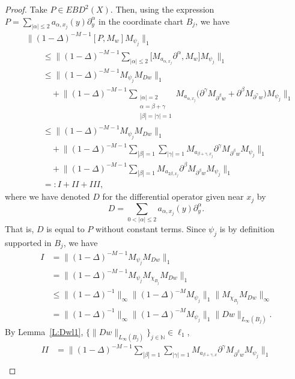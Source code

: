 \documentclass[pdftex]{sigma}
\numberwithin{equation}{section}
\begin{document}
\begin{proof}
Take $P \in EBD^2(X).$ Then, using the expression $P = \sum_{|\alpha|\leq 2} a_{\alpha,x_j}(y)\partial_y^{\alpha}$ in the coordinate chart $B_j$, we have
\begin{align*}
&\big\|(1-\Delta)^{-M-1}[P,M_w] M_{\psi_j}\big\|_1 \\
&\qquad{}
  \leq \bigg\|(1-\Delta)^{-M-1}\sum_{|\alpha|\leq 2} \big[M_{a_{\alpha,x_j}} \partial^\alpha,M_w\big] M_{\psi_j}\bigg\|_1\\
&\qquad {}\leq \big\|(1-\Delta)^{-M-1} M_{\psi_j} M_{D w}\big\|_1\\
&\qquad\quad{} + \bigg\|(1-\Delta)^{-M-1}\sum_{\substack{|\alpha|=2\\\alpha = \beta + \gamma\\|\beta|=|\gamma|= 1}} M_{a_{\alpha,x_j}} \big(\partial^\gamma M_{\partial^\beta w}+\partial^\beta M_{\partial^\gamma w}\big) M_{\psi_j}\bigg\|_1\\
&\qquad {}\leq \big\|(1-\Delta)^{-M-1} M_{\psi_j} M_{D w}\big\|_1\\
&\qquad\quad{} + \bigg\|(1-\Delta)^{-M-1}\sum_{|\beta|=1}\sum_{|\gamma|=1} M_{a_{\beta+\gamma,x_j}} \partial^\gamma M_{\partial^\beta w} M_{\psi_j}\bigg\|_1\\
&\qquad\quad{} + \bigg\|(1-\Delta)^{-M-1}\sum_{|\beta|=1} M_{a_{2\beta,x_j}} \partial^\beta M_{\partial^\beta w} M_{\psi_j}\bigg\|_1\\
&\qquad {}=: I + II + III,
\end{align*}
where we have denoted $D$ for the differential operator given near $x_j$ by
\[
 D = \sum_{0<|\alpha|\leq 2} a_{\alpha,x_j}(y)\partial_y^{\alpha}.
\]
That is, $D$ is equal to $P$ without constant terms. Since $\psi_j$ is by definition supported in $B_j$, we have
\begin{align*}
I &= \big\|(1-\Delta)^{-M-1} M_{\psi_j} M_{D w}\big\|_1\\
&= \big\|(1-\Delta)^{-M-1} M_{\psi_j} M_{\chi_{B_j}}M_{D w}\big\|_1\\
&\leq \big\| (1-\Delta)^{-1}\big\|_\infty \big\|(1-\Delta)^{-M} M_{\psi_j}\big\|_{1} \| M_{\chi_{B_j}}M_{D w} \|_\infty\\
&=\big\| (1-\Delta)^{-1}\big\|_\infty \big\|(1-\Delta)^{-M} M_{\psi_j}\big\|_{1} \| Dw \|_{L_\infty (B_j)}.
\end{align*}
By Lemma~\ref{L:Dwl1}, $\big\{\| Dw \|_{L_\infty (B_j)} \big\}_{j\in \mathbb{N}}\in \ell_1$,
\begin{align*}
II &= \bigg\|(1-\Delta)^{-M-1}\sum_{|\beta|=1}\sum_{|\gamma|=1} M_{a_{\beta+\gamma,x}} \partial^\gamma M_{\partial^\beta w} M_{\psi_j}\bigg\|_1\\

\end{align*}
\end{proof}
\end{document}
